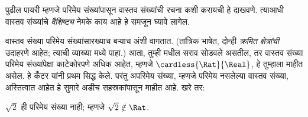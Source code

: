 \documentclass[../../../include/open-logic-section]{subfiles}
\begin{document}

पुढील पायरी म्हणजे परिमेय संख्यांपासून वास्तव संख्यांची रचना कशी करायची
हे दाखवणे. त्याआधी वास्तव संख्यांचे \emph{वैशिष्ट्य} नेमके काय आहे हे
समजून घ्यावे लागेल.

वास्तव संख्या परिमेय संख्यांसारख्याच बऱ्याच अंशी वागतात. (तांत्रिक
भाषेत, दोन्ही \emph{क्रमित क्षेत्रांची} उदाहरणे आहेत; त्याची व्याख्या
 मध्ये पाहा.) आता, तुम्ही 
मधील सराव सोडवले असतील, तर वास्तव संख्या परिमेय संख्यांपेक्षा काटेकोरपणे
अधिक आहेत, म्हणजे $\cardless{\Rat}{\Real}$, हे तुम्हाला माहीत असेल.
हे कँटर यांनी प्रथम सिद्ध केले. परंतु अपरिमेय संख्या, म्हणजे परिमेय
नसलेल्या वास्तव संख्या, अस्तित्वात आहेत हे सुमारे अडीच सहस्रकांपासून
माहीत आहे. खरे तर:
\begin{thm}
$\sqrt{2}$ ही परिमेय संख्या नाही; म्हणजे $\sqrt{2} \notin \Rat$.
\end{thm}
\end{document}
